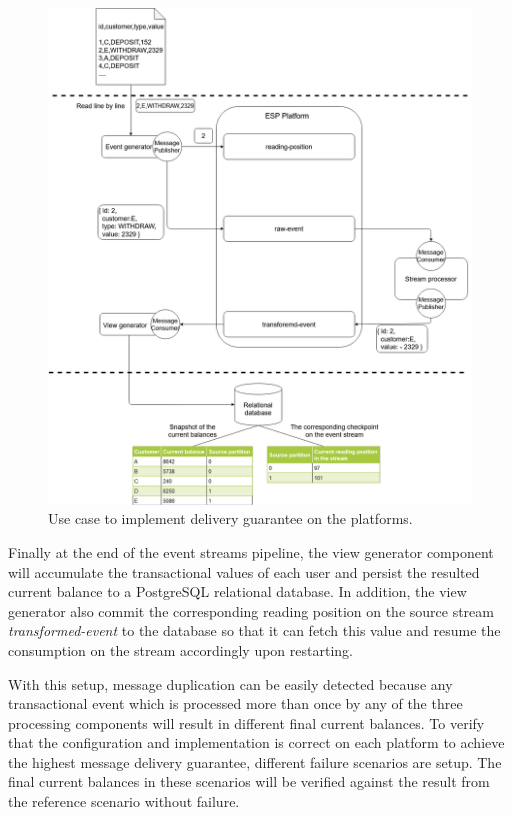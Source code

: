 \begin{figure}
\begin{adjustwidth}{-1cm}{}
	\centering
	\includegraphics[width=18cm,height=\textheight]{images/implementation-use-case-1.png}
	\caption{Use case to implement delivery guarantee on the platforms.}
	\label{fig:impusecase}
\end{adjustwidth}
\end{figure}


Finally at the end of the event streams pipeline, the view generator component will accumulate the transactional values of each user and persist the resulted current balance to a PostgreSQL relational database. In addition, the view generator also commit the corresponding reading position on the source stream \emph{transformed-event} to the database so that it can fetch this value and resume the consumption on the stream accordingly upon restarting.


With this setup, message duplication can be easily detected because any transactional event which is processed more than once by any of the three processing components will result in different final current balances. To verify that the configuration and implementation is correct on each platform to achieve the highest message delivery guarantee, different failure scenarios are setup. The final current balances in these scenarios will be verified against the result from the reference scenario without failure.

